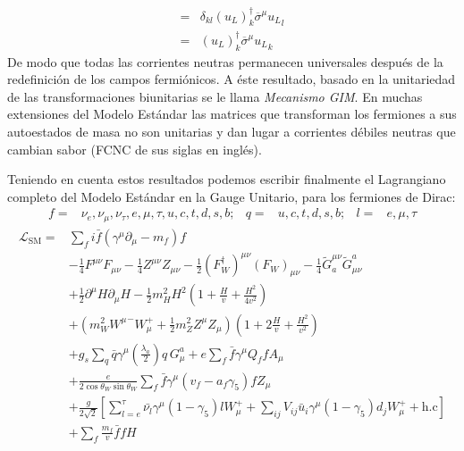 \begin{frame}
\begin{align}
  =&\delta_{kl}(u_L)^{\dagger}_k \overline{\sigma}^\mu{u_L}_l\nonumber\\
  =&(u_L)^{\dagger}_k\overline{\sigma}^\mu {u_L}_k
 \end{align}
De modo que todas las corrientes neutras permanecen universales después de la redefinición de los campos fermiónicos. A éste resultado, basado en la unitariedad de las transformaciones biunitarias se le llama \emph{Mecanismo GIM}. En muchas extensiones del Modelo Estándar las matrices que transforman los fermiones a sus autoestados de masa no son unitarias y dan lugar a corrientes débiles neutras que cambian sabor (FCNC de sus siglas en inglés). 


Teniendo en cuenta estos resultados podemos escribir finalmente el Lagrangiano completo del Modelo Estándar en la Gauge Unitario, para los fermiones de Dirac:
\begin{align}
  f=&\nu_e,\nu_\mu,\nu_\tau,e,\mu,\tau,u,c,t,d,s,b;&q=&u,c,t,d,s,b;&l=&e,\mu,\tau
\end{align}
\begin{align}
   \mathcal{L}_{\text{SM}}=&\sum_f i\bar{f}\left(\gamma^\mu\partial_\mu-m_f\right)f\nonumber\\
&-\tfrac{1}{4}F^{\mu\nu} F_{\mu\nu}-\tfrac{1}{4}Z^{\mu\nu} Z_{\mu\nu}-\tfrac{1}{2}(F_W^\dagger)^{\mu\nu} (F_W)_{\mu\nu}
- \tfrac{1}{4}\widetilde{G}^{\mu\nu}_a \widetilde{G}_{\mu\nu}^a\nonumber\\
&+\tfrac{1}{2}\partial^\mu H\partial_\mu H
-\frac{1}{2}m_H^2H^2\left(1+\frac{H}{v}+\frac{H^2}{4v^2}\right)\nonumber\\
&+\left(m_W^2{W^\mu}^-W_\mu^++\frac{1}{2}m_Z^2Z^\mu Z_\mu\right)\left(1+2\frac{H}{v}+\frac{H^2}{v^2}\right)\nonumber\\
&+g_s\sum_q\bar{q}\gamma^\mu\left(\frac{\lambda_a}{2}\right)q\,G_\mu^a+e\sum_f \bar{f}\gamma^\mu Q_f f A_\mu\nonumber\\
&+\frac{e}{2\cos\theta_W\sin\theta_W}\sum_{f}\bar{f}\gamma^\mu(v_f-a_f\gamma_5)f Z_\mu\nonumber\\
&+\frac{g}{2\sqrt{2}}\left[\sum_{l=e}^{\tau}\bar{\nu_l}\gamma^\mu(1-\gamma_5)l W_\mu^++\sum_{ij}V_{ij}\bar{u}_i\gamma^\mu(1-\gamma_5)d_j W_\mu^++\text{h.c}\right]\nonumber\\
&+\sum_f \frac{m_f}{v} \bar{f}f H\nonumber
\end{align}

\end{frame}

